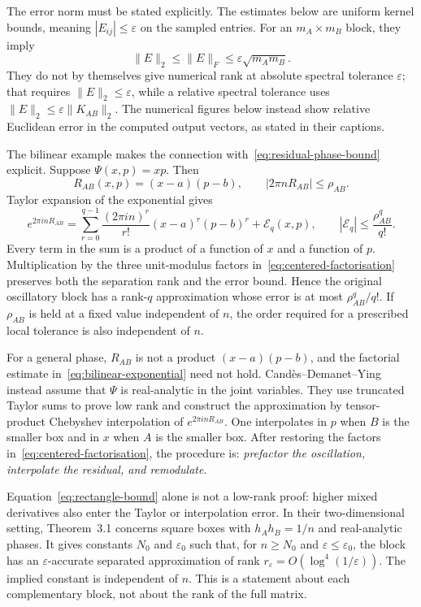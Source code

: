 \documentclass[11pt,a4paper]{article}
\numberwithin{equation}{section}
\begin{document}
The error norm must be stated explicitly. The estimates below are uniform kernel bounds, meaning $|E_{ij}|\leq\varepsilon$ on the sampled entries. For an $m_A\times m_B$ block, they imply
\begin{equation}
    \|E\|_2\leq\|E\|_F\leq\varepsilon\sqrt{m_Am_B}.
\end{equation}
They do not by themselves give numerical rank at absolute spectral tolerance $\varepsilon$; that requires $\|E\|_2\leq\varepsilon$, while a relative spectral tolerance uses $\|E\|_2\leq\varepsilon\|K_{AB}\|_2$. The numerical figures below instead show relative Euclidean error in the computed output vectors, as stated in their captions.

The bilinear example makes the connection with~\eqref{eq:residual-phase-bound} explicit. Suppose $\Psi(x,p)=xp$. Then
\begin{equation}
    R_{AB}(x,p)=(x-a)(p-b),
    \qquad
    |2\pi nR_{AB}|\leq\rho_{AB}.
\end{equation}
Taylor expansion of the exponential gives
\begin{equation}
    e^{2\pi i nR_{AB}}
    =\sum_{r=0}^{q-1}
     \frac{(2\pi i n)^r}{r!}(x-a)^r(p-b)^r
     +\mathcal{E}_q(x,p),
    \qquad
    |\mathcal{E}_q|\leq\frac{\rho_{AB}^q}{q!}.
    \label{eq:bilinear-exponential}
\end{equation}
Every term in the sum is a product of a function of $x$ and a function of $p$. Multiplication by the three unit-modulus factors in~\eqref{eq:centered-factorisation} preserves both the separation rank and the error bound. Hence the original oscillatory block has a rank-$q$ approximation whose error is at most $\rho_{AB}^q/q!$. If $\rho_{AB}$ is held at a fixed value independent of $n$, the order required for a prescribed local tolerance is also independent of $n$.

For a general phase, $R_{AB}$ is not a product $(x-a)(p-b)$, and the factorial estimate in~\eqref{eq:bilinear-exponential} need not hold. Cand\`{e}s--Demanet--Ying instead assume that $\Psi$ is real-analytic in the joint variables. They use truncated Taylor sums to prove low rank and construct the approximation by tensor-product Chebyshev interpolation of $e^{2\pi i nR_{AB}}$. One interpolates in $p$ when $B$ is the smaller box and in $x$ when $A$ is the smaller box. After restoring the factors in~\eqref{eq:centered-factorisation}, the procedure is: \emph{prefactor the oscillation, interpolate the residual, and remodulate}.

Equation~\eqref{eq:rectangle-bound} alone is not a low-rank proof: higher mixed derivatives also enter the Taylor or interpolation error. In their two-dimensional setting, Theorem~3.1 concerns square boxes with $h_Ah_B=1/n$ and real-analytic phases. It gives constants $N_0$ and $\varepsilon_0$ such that, for $n\geq N_0$ and $\varepsilon\leq\varepsilon_0$, the block has an $\varepsilon$-accurate separated approximation of rank $r_\varepsilon=O(\log^4(1/\varepsilon))$. The implied constant is independent of $n$. This is a statement about each complementary block, not about the rank of the full matrix.
\end{document}
